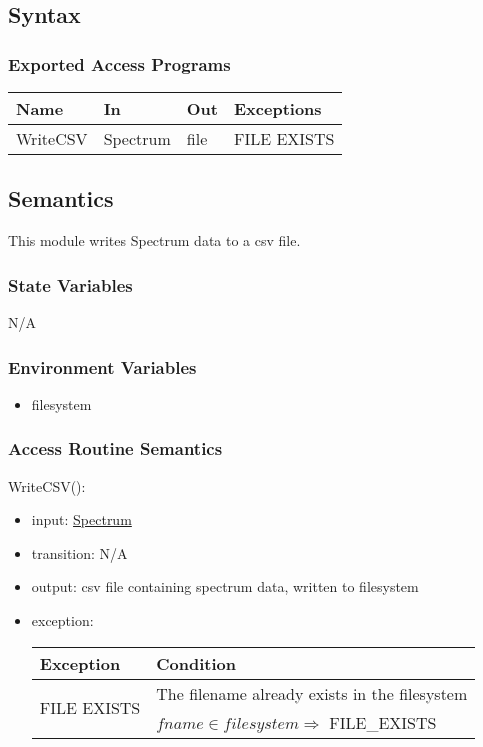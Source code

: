 \documentclass[12pt, titlepage]{article}
\begin{document}
\subsection{Syntax}

\subsubsection{Exported Access Programs}

\begin{center}
\begin{tabular}{p{2cm} p{4cm} p{3cm} p{4cm}}
\hline
\textbf{Name} & \textbf{In} & \textbf{Out} & \textbf{Exceptions} \\
\hline
WriteCSV & Spectrum & file & FILE EXISTS \\
\hline
\end{tabular}
\end{center}

\subsection{Semantics}
This module writes Spectrum data to a csv file.

\subsubsection{State Variables}
N/A

\subsubsection{Environment Variables}
\begin{itemize}
    \item filesystem
\end{itemize}

\subsubsection{Access Routine Semantics}

\noindent WriteCSV():
\begin{itemize}
    \item input: \hyperref[Mod:Spectrum]{Spectrum}
    \item transition: N/A
    \item output: csv file containing spectrum data, written to filesystem
    \item exception:
    \begin{center}
        \begin{tabular}{p{3cm} p{12cm}}
            \toprule[0.15em]
            \textbf{Exception} & \textbf{Condition}\\
            \midrule[0.1em]
            \multirow{2}{0.25\textwidth}{FILE EXISTS} & The filename already exists in the filesystem\\ 
            & $fname \in filesystem \Rightarrow$ FILE\_EXISTS\\ 
            \bottomrule[0.15em]
        \end{tabular}
    \end{center}
\end{itemize}
\end{document}
